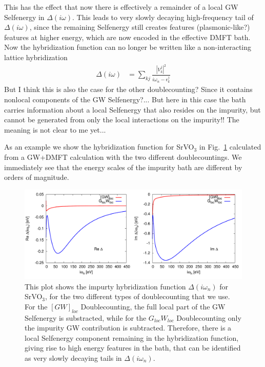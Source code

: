 \documentclass[12pt,a4paper]{scrartcl}
\numberwithin{equation}{section}
\begin{document}
\begin{itemize}
This has the effect that now there is effectively a remainder of a 
local GW Selfenergy in $\Delta(i\omega)$. This leads to very slowly
decaying high-frequency tail of $\Delta(i\omega)$, since the remaining
Selfenergy still creates features (plasmonic-like?) features at higher energy,
which are now encoded in the effective DMFT bath.
Now the hybridization function can no longer 
be written like a non-interacting lattice hybridization
\begin{align}
\Delta(i\omega) &= \sum_{kj} \frac{|V^j_k|^2}{i\omega_n - \epsilon_k^j}
\end{align}
But I think this is also the case for the other doublecounting?
Since it contains nonlocal components of the GW Selfenergy?...
But here in this case the bath carries information about a local Selfenergy
that also resides on the impurity, but cannot be generated from only
the local interactions on the impurity!!
The meaning is not clear to me yet...

\bigskip

As an example we show the hybridization function for SrVO$_3$
in Fig.~\ref{fig:hybrid_comp_SVO} calculated from a GW+DMFT calculation
with the two different doublecountings.
We immediately see that the energy scales of the impurity bath
are different by orders of magnitude. 

\begin{figure}[h]
\begin{center}
\includegraphics[width=1\textwidth]{figs/SrVO3_hybrid_dc_comp.pdf} 
\end{center}
\caption{This plot shows the impurty hybridization function
$\Delta(i\omega_n)$ for SrVO$_3$, for the two different types
of doublecounting that we use. 
For the $[GW]_{loc}$ Doublecounting, the full local part of the GW
Selfenergy  is substracted, while for the $G_{loc}W_{loc}$ Doublecounting
only the impurity GW contribution is subtracted. Therefore, 
there is a local Selfenergy component remaining in the hybridization
function, giving rise to high energy features in the bath, that can 
be identified as very slowly decaying tails in $\Delta(i\omega_n)$.}
\label{fig:hybrid_comp_SVO}
\end{figure}
\end{itemize}
\end{document}
